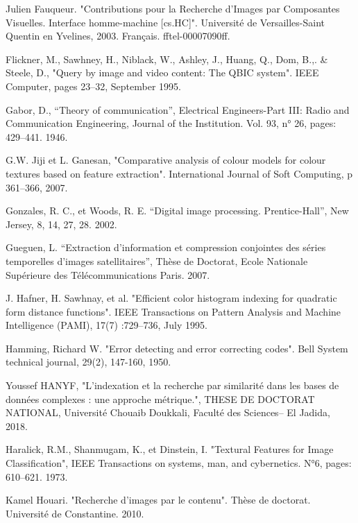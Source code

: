 \documentclass[
openany,
11pt, %
french, %
singlespacing, %
headsepline, %
]{MastersDoctoralThesis} %
\begin{document}
\begin{thebibliography}{widest entry}
	
	  Julien Fauqueur. "Contributions pour la Recherche d’Images par Composantes Visuelles. Interface homme-machine [cs.HC]". Université de Versailles-Saint Quentin en Yvelines, 2003. Français. ﬀtel-00007090ﬀ.
	
	
	  Flickner, M., Sawhney, H., Niblack, W., Ashley, J., Huang, Q., Dom, B.,. \& Steele, D., "Query by image and video content: The QBIC system". IEEE Computer, pages 23–32, September 1995.
	
	 Gabor, D., “Theory of communication”, Electrical Engineers-Part III: Radio and Communication Engineering, Journal of the Institution. Vol. 93, n° 26, pages: 429–441. 1946.
	
	 G.W. Jiji et L. Ganesan, "Comparative analysis of colour models for colour textures based on feature extraction". International Journal of Soft Computing, p 361–366, 2007.
	
	 Gonzales, R. C., et Woods, R. E. “Digital image processing. Prentice-Hall”, New Jersey, 8, 14, 27, 28. 2002.
	
	 Gueguen, L. “Extraction d’information et compression conjointes des séries temporelles d’images satellitaires”, Thèse de Doctorat, Ecole Nationale Supérieure des Télécommunications Paris. 2007.
	
	 J. Hafner, H. Sawhnay, et al. "Efficient color histogram indexing for quadratic form distance functions". IEEE Transactions on Pattern Analysis and Machine Intelligence (PAMI), 17(7) :729–736, July 1995.
	
	 Hamming, Richard W. "Error detecting and error correcting codes". Bell System technical journal, 29(2), 147-160, 1950.
	
	  Youssef HANYF, "L'indexation et la recherche par similarité dans les bases de données complexes : une approche métrique.", THESE DE DOCTORAT NATIONAL, Université Chouaib Doukkali, Faculté des Sciences– El Jadida, 2018.
	
	 Haralick, R.M., Shanmugam, K., et Dinstein, I. "Textural Features for Image Classification", IEEE Transactions on systems, man, and cybernetics. N°6, pages: 610–621. 1973.
	
	 Kamel Houari. "Recherche d’images par le contenu". Thèse de doctorat. Université de Constantine. 2010.
	

\end{thebibliography}
\end{document}
